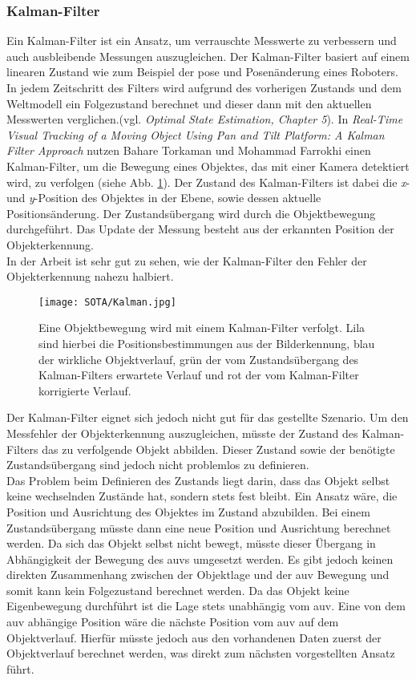 \subsubsection{Kalman-Filter}
Ein Kalman-Filter ist ein Ansatz, um verrauschte Messwerte zu verbessern und auch ausbleibende Messungen auszugleichen. Der Kalman-Filter basiert auf einem linearen Zustand wie zum Beispiel der \gls{pose} und Posenänderung eines Roboters. In jedem Zeitschritt des Filters wird aufgrund des vorherigen Zustands und dem Weltmodell ein Folgezustand berechnet und dieser dann mit den aktuellen Messwerten verglichen.(vgl. \textit{Optimal State Estimation, Chapter 5}\cite{simon2006optimal}).
In \textit{Real-Time Visual Tracking of a Moving Object Using Pan and Tilt Platform: A Kalman Filter Approach}\cite{torkaman2012real} nutzen Bahare Torkaman und Mohammad Farrokhi einen Kalman-Filter, um die Bewegung eines Objektes, das mit einer Kamera detektiert wird, zu verfolgen (siehe Abb. \ref{kalmanFilter}). Der Zustand des Kalman-Filters ist dabei die \textit{x}- und \textit{y}-Position des Objektes in der Ebene, sowie dessen aktuelle Positionsänderung. Der Zustandsübergang wird durch die Objektbewegung durchgeführt. Das Update der Messung besteht aus der erkannten Position der Objekterkennung.\\
In der Arbeit ist sehr gut zu sehen, wie der Kalman-Filter den Fehler der Objekterkennung nahezu halbiert.\\
\begin{figure}[H]
\centering
\texttt{[image: SOTA/Kalman.jpg]}
\caption[Schätzung einer Objektbewegung mit Kalman-Filter.]{Eine Objektbewegung wird mit einem Kalman-Filter verfolgt. Lila sind hierbei die Positionsbestimmungen aus der Bilderkennung, blau der wirkliche Objektverlauf, grün der vom Zustandsübergang des Kalman-Filters erwartete Verlauf und rot der vom Kalman-Filter korrigierte Verlauf.}
\label{kalmanFilter}
\end{figure}
Der Kalman-Filter eignet sich jedoch nicht gut für das gestellte Szenario. Um den Messfehler der Objekterkennung auszugleichen, müsste der Zustand des Kalman-Filters das zu verfolgende Objekt abbilden. Dieser Zustand sowie der benötigte Zustandsübergang sind jedoch nicht problemlos zu definieren.\\
Das Problem beim Definieren des Zustands liegt darin, dass das Objekt selbst keine wechselnden Zustände hat, sondern stets fest bleibt. Ein Ansatz wäre, die Position und Ausrichtung des Objektes im Zustand abzubilden. Bei einem Zustandsübergang müsste dann eine neue Position und Ausrichtung berechnet werden. Da sich das Objekt selbst nicht bewegt, müsste dieser Übergang in Abhängigkeit der Bewegung des \gls{auv}s umgesetzt werden. Es gibt jedoch keinen direkten Zusammenhang zwischen der Objektlage und der \gls{auv} Bewegung und somit kann kein Folgezustand berechnet werden. Da das Objekt keine Eigenbewegung durchführt ist die Lage stets unabhängig vom \gls{auv}. Eine von dem \gls{auv} abhängige Position wäre die nächste Position vom \gls{auv} auf dem Objektverlauf. Hierfür müsste jedoch aus den vorhandenen Daten zuerst der Objektverlauf berechnet werden, was direkt zum nächsten vorgestellten Ansatz führt.
